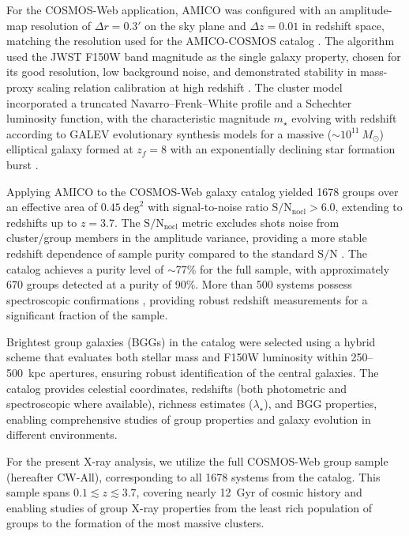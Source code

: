 \documentclass{aa}
\begin{document}
For the COSMOS-Web application, AMICO was configured with an amplitude-map resolution of $\Delta r = 0.3'$ on the sky plane and $\Delta z = 0.01$ in redshift space, matching the resolution used for the AMICO-COSMOS catalog \citep{Toni2024}. The algorithm used the JWST F150W band magnitude as the single galaxy property, chosen for its good resolution, low background noise, and demonstrated stability in mass-proxy scaling relation calibration at high redshift \citep{Toni2025}. The cluster model incorporated a truncated Navarro--Frenk--White \citep{Navarro1997} profile and a Schechter luminosity function, with the characteristic magnitude $m_\star$ evolving with redshift according to GALEV evolutionary synthesis models for a massive ($\sim 10^{11}~M_{\odot}$) elliptical galaxy formed at $z_f = 8$ with an exponentially declining star formation burst \citep{Toni2025}.

Applying AMICO to the COSMOS-Web galaxy catalog yielded 1678 groups over an effective area of $0.45~\mathrm{deg}^2$ with signal-to-noise ratio $\mathrm{S/N_{nocl}} > 6.0$, extending to redshifts up to $z = 3.7$. The $\mathrm{S/N_{nocl}}$ metric excludes shots noise from cluster/group members in the amplitude variance, providing a more stable redshift dependence of sample purity compared to the standard $\mathrm{S/N}$ \citep{Toni2025}. The catalog achieves a purity level of $\sim$77\% for the full sample, with approximately 670 groups detected at a purity of 90\%. More than 500 systems possess spectroscopic confirmations \citep{Khostovan2025}, providing robust redshift measurements for a significant fraction of the sample.

Brightest group galaxies (BGGs) in the catalog were selected using a hybrid scheme that evaluates both stellar mass and F150W luminosity within 250--500~kpc apertures, ensuring robust identification of the central galaxies. The catalog provides celestial coordinates, redshifts (both photometric and spectroscopic where available), richness estimates ($\lambda_\star$), and BGG properties, enabling comprehensive studies of group properties and galaxy evolution in different environments.

For the present X-ray analysis, we utilize the full COSMOS-Web group sample (hereafter CW-All), corresponding to all 1678 systems from the \citet{Toni2025} catalog. This sample spans $0.1 \lesssim z \lesssim 3.7$, covering nearly 12~Gyr of cosmic history and enabling studies of group X-ray properties from the least rich population of groups to the formation of the most massive clusters.
\end{document}
